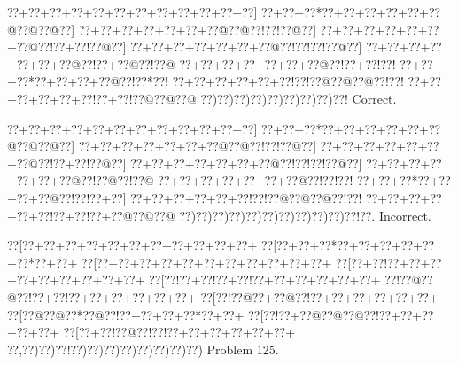 \documentclass[a5paper]{article}
\begin{document}
\begin{center}
{\goo
\0??+\0??+\0??+\0??+\0??+\0??+\0??+\0??+\0??+\0??+\0??+\0??]
\0??+\0??+\0??*\0??+\0??+\0??+\0??+\0??+\0??@\0??@\0??@\0??]
\0??+\0??+\0??+\0??+\0??+\0??+\0??@\0??@\0??!\0??!\0??@\0??]
\0??+\0??+\0??+\0??+\0??+\0??+\0??@\0??!\0??+\0??!\0??@\0??]
\0??+\0??+\0??+\0??+\0??+\0??+\0??@\0??!\0??!\0??!\0??@\0??]
\0??+\0??+\0??+\0??+\0??+\0??+\0??@\0??!\0??+\0??@\0??!\0??@
\0??+\0??+\0??+\0??+\0??+\0??+\0??@\0??!\0??+\0??!\0??!
\0??+\0??+\0??*\0??+\0??+\0??+\0??@\0??!\0??*\0??!
\0??+\0??+\0??+\0??+\0??+\0??!\0??!\0??@\0??@\0??@\0??!\0??!
\0??+\0??+\0??+\0??+\0??+\0??!\0??+\0??!\0??@\0??@\0??@
\0??)\0??)\0??)\0??)\0??)\0??)\0??)\0??)\0??!
}
Correct. 

\end{center}
\begin{center}
{\goo
\0??+\0??+\0??+\0??+\0??+\0??+\0??+\0??+\0??+\0??+\0??+\0??]
\0??+\0??+\0??*\0??+\0??+\0??+\0??+\0??+\0??@\0??@\0??@\0??]
\0??+\0??+\0??+\0??+\0??+\0??+\0??@\0??@\0??!\0??!\0??@\0??]
\0??+\0??+\0??+\0??+\0??+\0??+\0??@\0??!\0??+\0??!\0??@\0??]
\0??+\0??+\0??+\0??+\0??+\0??+\0??@\0??!\0??!\0??!\0??@\0??]
\0??+\0??+\0??+\0??+\0??+\0??+\0??@\0??!\0??@\0??!\0??@
\0??+\0??+\0??+\0??+\0??+\0??+\0??@\0??!\0??!\0??!
\0??+\0??+\0??*\0??+\0??+\0??+\0??@\0??!\0??!\0??+\0??]
\0??+\0??+\0??+\0??+\0??+\0??!\0??!\0??@\0??@\0??@\0??!\0??!
\0??+\0??+\0??+\0??+\0??+\0??!\0??+\0??!\0??+\0??@\0??@\0??@
\0??)\0??)\0??)\0??)\0??)\0??)\0??)\0??)\0??)\0??)\0??!\0??.
}
Incorrect. 

\end{center}
\newpage
\begin{center}
{\goo
\0??[\0??+\0??+\0??+\0??+\0??+\0??+\0??+\0??+\0??+\0??+\0??+
\0??[\0??+\0??+\0??*\0??+\0??+\0??+\0??+\0??+\0??*\0??+\0??+
\0??[\0??+\0??+\0??+\0??+\0??+\0??+\0??+\0??+\0??+\0??+\0??+
\0??[\0??+\0??!\0??+\0??+\0??+\0??+\0??+\0??+\0??+\0??+\0??+
\0??[\0??!\0??+\0??!\0??+\0??!\0??+\0??+\0??+\0??+\0??+\0??+
\0??!\0??@\0??@\0??!\0??+\0??!\0??+\0??+\0??+\0??+\0??+\0??+
\0??[\0??!\0??@\0??+\0??@\0??!\0??+\0??+\0??+\0??+\0??+\0??+
\0??[\0??@\0??@\0??*\0??@\0??!\0??+\0??+\0??+\0??*\0??+\0??+
\0??[\0??!\0??+\0??@\0??@\0??@\0??!\0??+\0??+\0??+\0??+\0??+
\0??[\0??+\0??!\0??@\0??!\0??!\0??+\0??+\0??+\0??+\0??+\0??+
\0??,\0??)\0??)\0??!\0??)\0??)\0??)\0??)\0??)\0??)\0??)\0??)
}
Problem 125.

\end{center}
\end{document}
